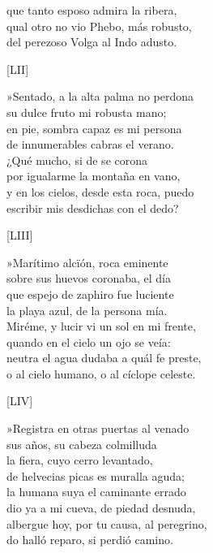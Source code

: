 \documentclass[11pt,a4paper,twoside]{article}
\newcommand{\guno}{\emph{G1}}
\begin{document}
que tanto esposo admira la ribera,\\
qual otro no vio Phebo, más robusto,\\
del perezoso Volga al Indo adusto.\par\pend
%
\begin{center}
	[LII]
\end{center}\pstart
»Sentado, a la alta palma no perdona\\
su dulce fruto mi robusta mano;\\
en pie, sombra capaz es mi persona\\
de innumerables cabras el verano.\\
¿Qué mucho, si de \edtext{nubes}{\Afootnote{nieues {\guno}}} se corona\\
por igualarme la montaña en vano,\\
y en los cielos, desde esta roca, puedo\\
escribir mis desdichas con el dedo?\par\pend
%
\begin{center}
	[LIII]
\end{center}\pstart
»Marítimo alcïón, roca eminente\\
sobre sus huevos coronaba, el día\\
que espejo de zaphiro fue luciente\\
la playa azul, de la persona mía.\\
Miréme, y lucir vi un sol en mi frente,\\
quando en el cielo un ojo se veía:\\
neutra el agua dudaba a quál fe preste,\\
o al cielo humano, o al cíclope celeste.\par\pend
%
\begin{center}
	[LIV]
\end{center}\pstart
»Registra en otras puertas al venado\\
sus años, su cabeza colmilluda\\
la fiera, cuyo cerro levantado,\\
de helvecias picas es muralla aguda;\\
la humana suya el caminante errado\\
dio ya a mi cueva, de piedad desnuda,\\
albergue hoy, por tu causa, al peregrino,\\
do halló reparo, si perdió camino.\par\pend
\end{document}
